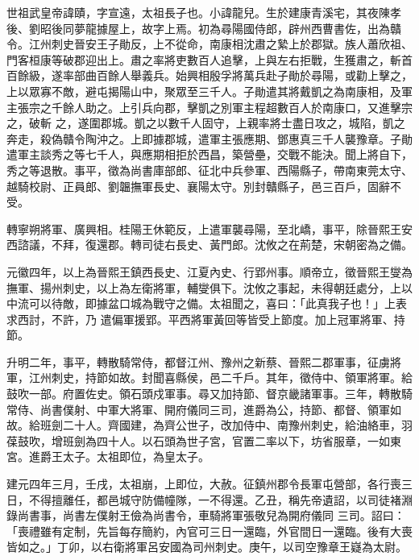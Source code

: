 
\begin{pinyinscope}

 世祖武皇帝諱賾，字宣遠，太祖長子也。小諱龍兒。生於建康青溪宅，其夜陳孝後、劉昭後同夢龍據屋上，故字上焉。初為尋陽國侍郎，辟州西曹書佐，出為贛令。江州刺史晉安王子勛反，上不從命，南康相沈肅之縶上於郡獄。族人蕭欣祖、門客桓康等破郡迎出上。肅之率將吏數百人追擊，上與左右拒戰，生獲肅之，斬首百餘級，遂率部曲百餘人舉義兵。始興相殷孚將萬兵赴子勛於尋陽，或勸上擊之，上以眾寡不敵，避屯揭陽山中，聚眾至三千人。子勛遣其將戴凱之為南康相，及軍主張宗之千餘人助之。上引兵向郡，擊凱之別軍主程超數百人於南康口，又進擊宗之，破斬
 之，遂圍郡城。凱之以數千人固守，上親率將士盡日攻之，城陷，凱之奔走，殺偽贛令陶沖之。上即據郡城，遣軍主張應期、鄧惠真三千人襲豫章。子勛遣軍主談秀之等七千人，與應期相拒於西昌，築營壘，交戰不能決。聞上將自下，秀之等退散。事平，徵為尚書庫部郎、征北中兵參軍、西陽縣子，帶南東莞太守、越騎校尉、正員郎、劉韞撫軍長史、襄陽太守。別封贛縣子，邑三百戶，固辭不受。



 轉寧朔將軍、廣興相。桂陽王休範反，上遣軍襲尋陽，至北嶠，事平，除晉熙王安西諮議，不拜，復還郡。轉司徒右長史、黃門郎。沈攸之在荊楚，宋朝密為之備。



 元徽四年，以上為晉熙王鎮西長史、江夏內史、行郢州事。順帝立，徵晉熙王燮為撫軍、揚州刺史，以上為左衛將軍，輔燮俱下。沈攸之事起，未得朝廷處分，上以中流可以待敵，即據盆口城為戰守之備。太祖聞之，喜曰：「此真我子也！」上表求西討，不許，乃
 遣偏軍援郢。平西將軍黃回等皆受上節度。加上冠軍將軍、持節。



 升明二年，事平，轉散騎常侍，都督江州、豫州之新蔡、晉熙二郡軍事，征虜將軍，江州刺史，持節如故。封聞喜縣侯，邑二千戶。其年，徵侍中、領軍將軍。給鼓吹一部。府置佐史。領石頭戍軍事。尋又加持節、督京畿諸軍事。三年，轉散騎常侍、尚書僕射、中軍大將軍、開府儀同三司，進爵為公，持節、都督、領軍如故。給班劍二十人。齊國建，為齊公世子，改加侍中、南豫州刺史，給油絡車，羽葆鼓吹，增班劍為四十人。以石頭為世子宮，官置二率以下，坊省服章，一如東宮。進爵王太子。太祖即位，為皇太子。



 建元四年三月，壬戌，太祖崩，上即位，大赦。征鎮州郡令長軍屯營部，各行喪三日，不得擅離任，都邑城守防備幢隊，一不得還。乙丑，稱先帝遺詔，以司徒褚淵錄尚書事，尚書左僕射王儉為尚書令，車騎將軍張敬兒為開府儀同
 三司。詔曰：「喪禮雖有定制，先旨每存簡約，內官可三日一還臨，外官間日一還臨。後有大喪皆如之。」丁卯，以右衛將軍呂安國為司州刺史。庚午，以司空豫章王嶷為太尉。




\end{pinyinscope}
